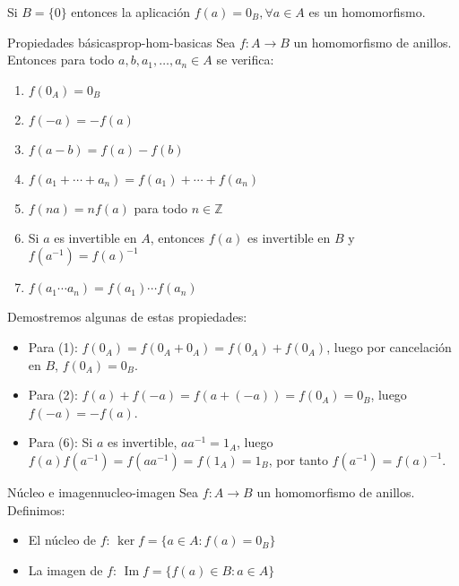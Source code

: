 \begin{example}{}{}
    Si $B = \{0\}$ entonces la aplicación $f(a) = 0_B, \forall a \in A$ es un homomorfismo.
\end{example}

\begin{proposition}{Propiedades básicas}{prop-hom-basicas}
    Sea \(f: A \to B\) un homomorfismo de anillos. Entonces para todo \(a, b, a_1, \ldots, a_n \in A\) se verifica:
    \begin{enumerate}
        \item \(f(0_A) = 0_B\)
        \item \(f(-a) = -f(a)\)
        \item \(f(a - b) = f(a) - f(b)\)
        \item \(f(a_1 + \cdots + a_n) = f(a_1) + \cdots + f(a_n)\)
        \item \(f(na) = nf(a)\) para todo \(n \in \mathbb{Z}\)
        \item Si \(a\) es invertible en \(A\), entonces \(f(a)\) es invertible en \(B\) y \(f(a^{-1}) = f(a)^{-1}\)
        \item \(f(a_1 \cdots a_n) = f(a_1) \cdots f(a_n)\)
    \end{enumerate}
\end{proposition}

\begin{proofbox}
    Demostremos algunas de estas propiedades:
    \begin{itemize}
        \item Para (1): \(f(0_A) = f(0_A + 0_A) = f(0_A) + f(0_A)\), luego por cancelación en \(B\), \(f(0_A) = 0_B\).
        
        \item Para (2): \(f(a) + f(-a) = f(a + (-a)) = f(0_A) = 0_B\), luego \(f(-a) = -f(a)\).
        
        \item Para (6): Si \(a\) es invertible, \(aa^{-1} = 1_A\), luego \(f(a)f(a^{-1}) = f(aa^{-1}) = f(1_A) = 1_B\), por tanto \(f(a^{-1}) = f(a)^{-1}\).
    \end{itemize}
\end{proofbox}

\begin{definition}{Núcleo e imagen}{nucleo-imagen}
    Sea \(f: A \to B\) un homomorfismo de anillos. Definimos:
    \begin{itemize}
        \item El {núcleo} de \(f\): \(\ker f = \{a \in A : f(a) = 0_B\}\)
        \item La {imagen} de \(f\): \(\operatorname{Im} f = \{f(a) \in B : a \in A\}\)
    \end{itemize}
\end{definition}

